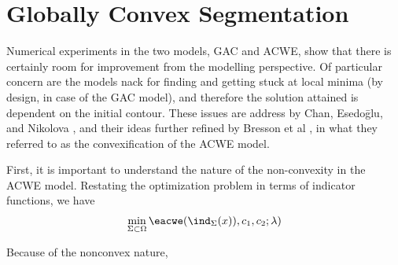 \chapter{Globally Convex Segmentation}
Numerical experiments in the two models, GAC and ACWE, show that there is certainly room for improvement from the modelling perspective. Of particular concern are the models nack for finding and getting stuck at local minima (by design, in case of the GAC model), and therefore the solution attained is dependent on the initial contour. These issues are address by Chan, Esedo\={g}lu, and Nikolova \cite{chan2006algorithms}, and their ideas further refined by Bresson et al \cite{bresson2007fast}, in what they referred to as the convexification of the ACWE model.

First, it is important to understand the nature of the non-convexity in the ACWE model. Restating the optimization problem in terms of indicator functions, we have 
\begin{align*}
\min_{\Sigma\subset\Omega} \eacwe(\ind_\Sigma(x)), c_1, c_2; \lambda) 
\end{align*}

Because of the nonconvex nature, 